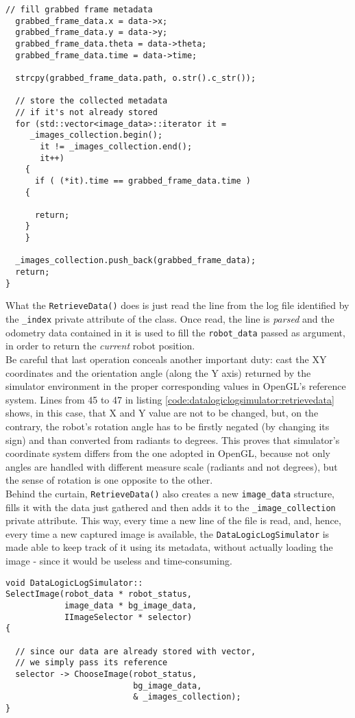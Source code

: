 \begin{lstlisting}[caption={\texttt{DataLogicLogSimulator::RetrieveData()} method},
    label={code:datalogiclogsimulator:retrievedata}]
  // fill grabbed frame metadata
  grabbed_frame_data.x = data->x;
  grabbed_frame_data.y = data->y;
  grabbed_frame_data.theta = data->theta;
  grabbed_frame_data.time = data->time;

  strcpy(grabbed_frame_data.path, o.str().c_str());

  // store the collected metadata 
  // if it's not already stored
  for (std::vector<image_data>::iterator it =
	 _images_collection.begin();
       it != _images_collection.end();
       it++)
    {
      if ( (*it).time == grabbed_frame_data.time )
	{

	  return;
	}
    }

  _images_collection.push_back(grabbed_frame_data);
  return;
}
\end{lstlisting}

What the \texttt{RetrieveData()} does is just read the line from the log 
file identified by the \texttt{\_index} private attribute of the class.
Once read, the line is \textit{parsed} and the odometry data contained 
in it is used to fill the \texttt{robot\_data} passed as argument, in 
order to return the \textit{current} robot position.
\\
Be careful that last operation conceals another important duty: cast the
XY coordinates and the orientation angle (along the Y axis) returned
by the simulator environment in the proper corresponding values in OpenGL's
reference system. Lines from 45 to 47 in listing
\ref{code:datalogiclogsimulator:retrievedata} shows, in this case,
that X and Y value are not to be changed, but, on the contrary, the robot's
rotation angle has to be firstly negated (by changing its sign) and
than converted from radiants to degrees. This proves that simulator's coordinate
system differs from the one adopted in OpenGL, because not only angles
are handled with different measure scale (radiants and not degrees), but the
sense of rotation is one opposite to the other.
\\
Behind the curtain, \texttt{RetrieveData()} also creates a new 
\texttt{image\_data} structure, fills it with the data just 
gathered and then adds it to the \texttt{\_image\_collection} 
private attribute.
This way, every time a new line of the file is read, and, hence, 
every time a new captured image is available, the \texttt{DataLogicLogSimulator} 
is made able to keep track of it using its metadata, without actually 
loading the image - since it would be useless and time-consuming.
\\
\begin{lstlisting}[caption={\texttt{DataLogicLogSimulator::SelectImage()} method},
    label={code:datalogiclogsimulator:selectimage}]
void DataLogicLogSimulator::
SelectImage(robot_data * robot_status,
            image_data * bg_image_data,
            IImageSelector * selector)
{

  // since our data are already stored with vector,
  // we simply pass its reference
  selector -> ChooseImage(robot_status, 
                          bg_image_data, 
                          & _images_collection);
}
\end{lstlisting}

